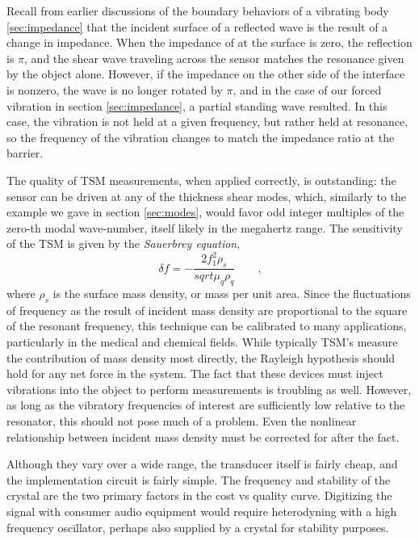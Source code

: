\documentclass[a4paper,10pt]{report}
\numberwithin{equation}{section}
\begin{document}
Recall from earlier discussions of the boundary behaviors of a vibrating body \ref{sec:impedance} that the incident surface of a reflected wave is the result of a change in impedance. When the impedance of at the surface is zero, the reflection is $\pi$, and the shear wave traveling across the sensor matches the resonance given by the object alone. However, if the impedance on the other side of the interface is nonzero, the wave is no longer rotated by $\pi$, and in the case of our forced vibration in section \ref{sec:impedance}, a partial standing wave resulted. \cite[p.~119]{Cremer1973} In this case, the vibration is not held at a given frequency, but rather held at resonance, so the frequency of the vibration changes to match the impedance ratio at the barrier. 

The quality of TSM measurements, when applied correctly, is outstanding: the sensor can be driven at any of the thickness shear modes, which, similarly to the example we gave in section \ref{sec:modes}, would favor odd integer multiples of the zero-th modal wave-number, itself likely in the megahertz range. The sensitivity of the TSM is given by the \emph{Sauerbrey equation},\cite[p.~44]{Ballantine1997}
\begin{equation*}
\delta f = - \frac{2 f_1^2 \rho_s}{sqrt{\mu_q \rho_q}} \qquad \text{,}
\end{equation*}
where $\rho_s$ is the surface mass density, or mass per unit area. Since the fluctuations of frequency as the result of incident mass density are proportional to the square of the resonant frequency, this technique can be calibrated to many applications, particularly in the medical and chemical fields. While typically TSM's measure the contribution of mass density most directly, the Rayleigh hypothesis should hold for any net force in the system. The fact that these devices must inject vibrations into the object to perform measurements is troubling as well. However, as long as the vibratory frequencies of interest are sufficiently low relative to the resonator, this should not pose much of a problem. Even the nonlinear relationship between incident mass density must be corrected for after the fact.

Although they vary over a wide range, the transducer itself is fairly cheap, and the implementation circuit is fairly simple. The frequency and stability of the crystal are the two primary factors in the cost vs quality curve. Digitizing the signal with consumer audio equipment would require heterodyning with a high frequency oscillator, perhaps also supplied by a crystal for stability purposes.
\end{document}
